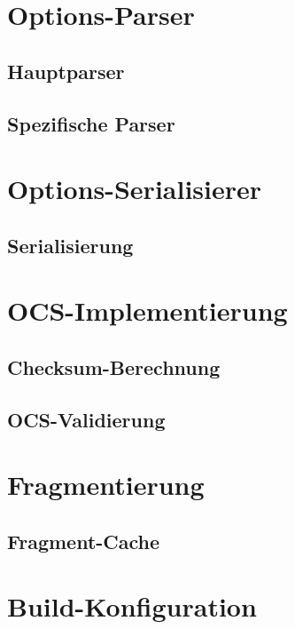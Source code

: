 \section{Options-Parser}
\label{sec:options-parser}

\subsection{Hauptparser}
\label{subsec:hauptparser}

\subsection{Spezifische Parser}
\label{subsec:spezifische-parser}

\section{Options-Serialisierer}
\label{sec:options-serialisierer}

\subsection{Serialisierung}
\label{subsec:serialisierung-impl}

\section{OCS-Implementierung}
\label{sec:ocs-implementierung}

\subsection{Checksum-Berechnung}
\label{subsec:checksum-impl}

\subsection{OCS-Validierung}
\label{subsec:ocs-validierung}

\section{Fragmentierung}
\label{sec:frag-implementierung}

\subsection{Fragment-Cache}
\label{subsec:fragment-cache-impl}

\section{Build-Konfiguration}
\label{sec:build}

